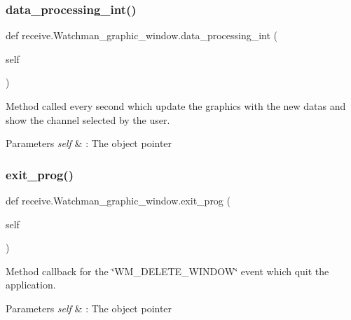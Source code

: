 \subsubsection{\texorpdfstring{data\_processing\_int()}{data\_processing\_int()}\hspace{0.1cm}{\footnotesize\ttfamily [2/2]}}
{\footnotesize\ttfamily def receive.\+Watchman\+\_\+graphic\+\_\+window.\+data\+\_\+processing\+\_\+int (\begin{DoxyParamCaption}\item[{}]{self }\end{DoxyParamCaption})}



Method called every second which update the graphics with the new datas and show the channel selected by the user. 


\begin{DoxyParams}{Parameters}
{\em self} & \+: The object pointer \\
\hline
\end{DoxyParams}
\mbox{\label{classreceive_1_1_watchman__graphic__window_a22cace25ba6be74a865cabbde2b0de65}} 
\subsubsection{\texorpdfstring{exit\_prog()}{exit\_prog()}}
{\footnotesize\ttfamily def receive.\+Watchman\+\_\+graphic\+\_\+window.\+exit\+\_\+prog (\begin{DoxyParamCaption}\item[{}]{self }\end{DoxyParamCaption})}



Method callback for the \char`\"{}\+W\+M\+\_\+\+D\+E\+L\+E\+T\+E\+\_\+\+W\+I\+N\+D\+O\+W\char`\"{} event which quit the application. 


\begin{DoxyParams}{Parameters}
{\em self} & \+: The object pointer \\
\hline
\end{DoxyParams}
\mbox{\label{classreceive_1_1_watchman__graphic__window_acced41ba9696b91f924f1505a6d7b88f}} 
